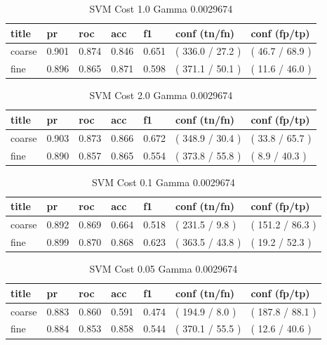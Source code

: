 \documentclass[ms]{nuthesis}
\begin{document}
\FloatBarrier
\begin{table}[H]
\centering
\begin{tabular}{|l||l||l||l||l||l||l|}\toprule
title & pr & roc & acc & f1 & conf (tn/fn) & conf (fp/tp) \\ \midrule
coarse & 0.901 & 0.874 & 0.846 & 0.651 & ( 336.0 / 27.2 ) & ( 46.7 / 68.9 ) \\
fine & 0.896 & 0.865 & 0.871 & 0.598 & ( 371.1 / 50.1 ) & ( 11.6 / 46.0 ) \\ \bottomrule
\end{tabular}
\caption{SVM Cost 1.0 Gamma 0.0029674}
\label{tab:SVM-C1-Gp0029674}
\end{table}
\FloatBarrier


\FloatBarrier
\begin{table}[H]
\centering
\begin{tabular}{|l||l||l||l||l||l||l|}\toprule
title & pr & roc & acc & f1 & conf (tn/fn) & conf (fp/tp) \\ \midrule
coarse & 0.903 & 0.873 & 0.866 & 0.672 & ( 348.9 / 30.4 ) & ( 33.8 / 65.7 ) \\
fine & 0.890 & 0.857 & 0.865 & 0.554 & ( 373.8 / 55.8 ) & ( 8.9 / 40.3 ) \\ \bottomrule
\end{tabular}
\caption{SVM Cost 2.0 Gamma 0.0029674}
\label{tab:SVM-C2-Gp0029674}
\end{table}
\FloatBarrier



\FloatBarrier
\begin{table}[H]
\centering
\begin{tabular}{|l||l||l||l||l||l||l|}\toprule
title & pr & roc & acc & f1 & conf (tn/fn) & conf (fp/tp) \\ \midrule
coarse & 0.892 & 0.869 & 0.664 & 0.518 & ( 231.5 / 9.8 ) & ( 151.2 / 86.3 ) \\
fine & 0.899 & 0.870 & 0.868 & 0.623 & ( 363.5 / 43.8 ) & ( 19.2 / 52.3 ) \\ \bottomrule
\end{tabular}
\caption{SVM Cost 0.1 Gamma 0.0029674}
\label{tab:SVM-Cp1-Gp0029674}
\end{table}
\FloatBarrier


\FloatBarrier
\begin{table}[H]
\centering
\begin{tabular}{|l||l||l||l||l||l||l|}\toprule
title & pr & roc & acc & f1 & conf (tn/fn) & conf (fp/tp) \\ \midrule
coarse & 0.883 & 0.860 & 0.591 & 0.474 & ( 194.9 / 8.0 ) & ( 187.8 / 88.1 ) \\
fine & 0.884 & 0.853 & 0.858 & 0.544 & ( 370.1 / 55.5 ) & ( 12.6 / 40.6 ) \\ \bottomrule
\end{tabular}
\caption{SVM Cost 0.05 Gamma 0.0029674}
\label{tab:SVM-Cp05-Gp0029674}
\end{table}
\FloatBarrier
\end{document}
